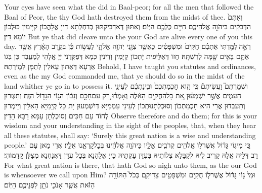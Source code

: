 {Your eyes have seen what the \lord\space did in Baal-peor; for all the men that followed the Baal of Peor, the \lord\space thy God hath destroyed them from the midst of thee.}{}
{וְאַתֶּם֙ הַדְּבֵקִ֔ים בַּיהֹוָ֖ה אֱלֹהֵיכֶ֑ם חַיִּ֥ים כֻּלְּכֶ֖ם הַיּֽוֹם׃}
{וְאַתּוּן דְּאִדְּבֵיקְתּוּן בְּדַחְלְתָא דַּייָ אֱלָהֲכוֹן קַיָּימִין כּוּלְּכוֹן יוֹמָא דֵין׃}
{But ye that did cleave unto the \lord\space your God are alive every one of you this day.}{}
{רְאֵ֣ה \legarmeh  לִמַּ֣דְתִּי אֶתְכֶ֗ם חֻקִּים֙ וּמִשְׁפָּטִ֔ים כַּאֲשֶׁ֥ר צִוַּ֖נִי יְהֹוָ֣ה אֱלֹהָ֑י לַעֲשׂ֣וֹת כֵּ֔ן בְּקֶ֣רֶב הָאָ֔רֶץ אֲשֶׁ֥ר אַתֶּ֛ם בָּאִ֥ים שָׁ֖מָּה לְרִשְׁתָּֽהּ׃}
{חֲזוֹ דְּאַלֵּיפִית יָתְכוֹן קְיָמִין וְדִינִין כְּמָא דְּפַקְּדַנִי יְיָ אֱלָהִי לְמֶעֱבַד כֵּן בְּגוֹ אַרְעָא דְּאַתּוּן עָאלִין לְתַמָּן לְמֵירְתַהּ׃}
{Behold, I have taught you statutes and ordinances, even as the \lord\space my God commanded me, that ye should do so in the midst of the land whither ye go in to possess it.}{}
{וּשְׁמַרְתֶּם֮ וַעֲשִׂיתֶם֒ כִּ֣י הִ֤וא חׇכְמַתְכֶם֙ וּבִ֣ינַתְכֶ֔ם לְעֵינֵ֖י הָעַמִּ֑ים אֲשֶׁ֣ר יִשְׁמְע֗וּן אֵ֚ת כׇּל\maqqaf הַחֻקִּ֣ים הָאֵ֔לֶּה וְאָמְר֗וּ רַ֚ק עַם\maqqaf חָכָ֣ם וְנָב֔וֹן הַגּ֥וֹי הַגָּד֖וֹל הַזֶּֽה׃}
{וְתִטְּרוּן וְתַעְבְּדוּן אֲרֵי הִיא חָכְמַתְכוֹן וְסוּכְלְתָנוּתְכוֹן לְעֵינֵי עַמְמַיָּא דְּיִשְׁמְעוּן יָת כָּל קְיָמַיָּא הָאִלֵּין וְיֵימְרוּן לְחוֹד עַם חַכִּים וְסוּכְלְתָן עַמָּא רַבָּא הָדֵין׃}
{Observe therefore and do them; for this is your wisdom and your understanding in the sight of the peoples, that, when they hear all these statutes, shall say: ‘Surely this great nation is a wise and understanding people.’}{}
{כִּ֚י מִי\maqqaf ג֣וֹי גָּד֔וֹל אֲשֶׁר\maqqaf ל֥וֹ אֱלֹהִ֖ים קְרֹבִ֣ים אֵלָ֑יו כַּיהֹוָ֣ה אֱלֹהֵ֔ינוּ בְּכׇל\maqqaf קׇרְאֵ֖נוּ אֵלָֽיו׃}
{אֲרֵי מַאן עַם רַב דְּלֵיהּ אֱלָהּ קָרִיב לֵיהּ לְקַבָּלָא צְלוֹתֵיהּ בְּעִדָּן עָקְתֵיהּ כַּייָ אֱלָהַנָא בְּכָל עִדָּן דַּאֲנַחְנָא מְצַלַּן קֳדָמוֹהִי׃}
{For what great nation is there, that hath God so nigh unto them, as the \lord\space our God is whensoever we call upon Him?}{}
{וּמִי֙ גּ֣וֹי גָּד֔וֹל אֲשֶׁר\maqqaf ל֛וֹ חֻקִּ֥ים וּמִשְׁפָּטִ֖ים צַדִּיקִ֑ם כְּכֹל֙ הַתּוֹרָ֣ה הַזֹּ֔את אֲשֶׁ֧ר אָנֹכִ֛י נֹתֵ֥ן לִפְנֵיכֶ֖ם הַיּֽוֹם׃}
